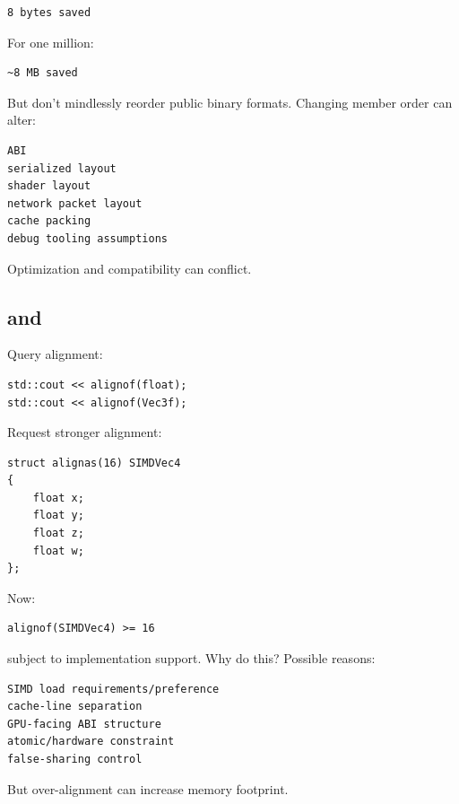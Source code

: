 \begin{verbatim}
8 bytes saved
\end{verbatim}

For one million:

\begin{verbatim}
~8 MB saved
\end{verbatim}

But don't mindlessly reorder public binary formats. Changing member order can alter:

\begin{verbatim}
ABI
serialized layout
shader layout
network packet layout
cache packing
debug tooling assumptions
\end{verbatim}

Optimization and compatibility can conflict.

\subsection{\texorpdfstring{ and }{ and }}\label{05-engine-i-ch003-alignof-and-alignas}

\hypertarget{05-engine-i-ch003-alignof-and-alignas}{}

Query alignment:

\begin{verbatim}
std::cout << alignof(float);
std::cout << alignof(Vec3f);
\end{verbatim}

Request stronger alignment:

\begin{verbatim}
struct alignas(16) SIMDVec4
{
    float x;
    float y;
    float z;
    float w;
};
\end{verbatim}

Now:

\begin{verbatim}
alignof(SIMDVec4) >= 16
\end{verbatim}

subject to implementation support. Why do this? Possible reasons:

\begin{verbatim}
SIMD load requirements/preference
cache-line separation
GPU-facing ABI structure
atomic/hardware constraint
false-sharing control
\end{verbatim}

But over-alignment can increase memory footprint.

